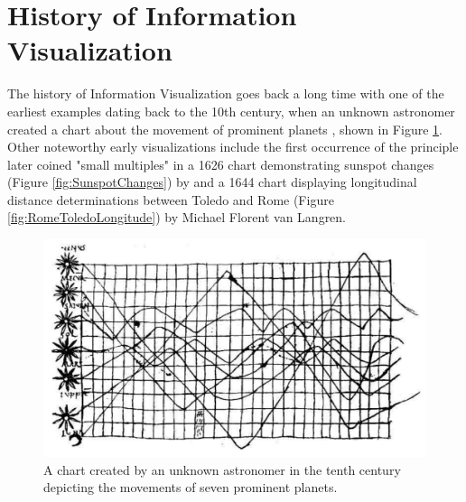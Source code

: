 \section{History of Information Visualization}

The history of Information Visualization goes back a long time with one of the earliest examples dating back to the 10th century, when an unknown astronomer created a chart about the movement of prominent planets \parencite{CommentariiInSomniumScipionis}, shown in Figure \ref{fig:PlanetaryMovements}.
Other noteworthy early visualizations include the first occurrence of the principle \cite{VisualDisplayOfQuantitativeInformation} later coined "small multiples" in a 1626 chart demonstrating sunspot changes (Figure \ref{fig:SunspotChanges}) by \cite{RosaUrsina} and a 1644 chart displaying longitudinal distance determinations between Toledo and Rome (Figure \ref{fig:RomeToledoLongitude}) by Michael Florent van Langren.

\begin{figure}[tp]
\centering
\includegraphics[keepaspectratio,width=\linewidth,height=\fullh / 3]{images/planetary-movements.png}
\caption[Chart of Planetary Movements from the Tenth Century]{
  A chart created by an unknown astronomer in the tenth century depicting the movements of seven prominent planets.
}
\label{fig:PlanetaryMovements}
\end{figure}

